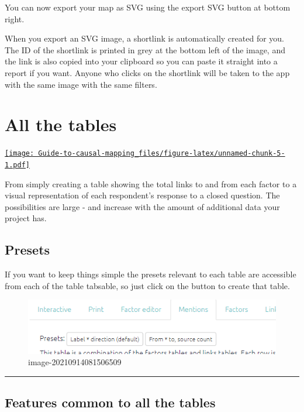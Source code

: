 \documentclass[
]{book}
\begin{document}
You can now export your map as SVG using the export SVG button at bottom right.

When you export an SVG image, a shortlink is automatically created for you. The ID of the shortlink is printed in grey at the bottom left of the image, and the link is also copied into your clipboard so you can paste it straight into a report if you want. Anyone who clicks on the shortlink will be taken to the app with the same image with the same filters.

\hypertarget{xall-tables-old}{%
\chapter{All the tables}\label{xall-tables-old}}

\href{https://player.vimeo.com/video/596519456}{\texttt{[image: Guide-to-causal-mapping\_files/figure-latex/unnamed-chunk-5-1.pdf]}}

From simply creating a table showing the total links to and from each factor to a visual representation of each respondent's response to a closed question. The possibilities are large - and increase with the amount of additional data your project has.

\hypertarget{preset-tables-old}{%
\section{Presets}\label{preset-tables-old}}

If you want to keep things simple the presets relevant to each table are accessible from each of the table tabsable, so just click on the button to create that table.

\begin{figure}
\centering
\includegraphics[width=6.77083in,height=\textheight]{_assets/image-20210914081506509.png}
\caption{image-20210914081506509}
\end{figure}

\begin{center}\rule{0.5\linewidth}{0.5pt}\end{center}

\hypertarget{tables_common-old}{%
\section{Features common to all the tables}\label{tables_common-old}}
\end{document}
